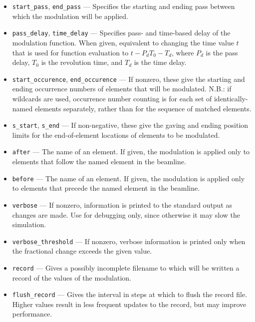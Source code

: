 \documentclass[11pt]{article}
\begin{document}
\begin{itemize}
\begin{itemize}
    \item \verb|differential=0|, \verb|multiplicative=0|: $v(t) = f A(t)$.  
    \item \verb|differential=1|, \verb|multiplicative=1|: $v(t) = v_0 + v_0 f A(t)$.  
    \item \verb|differential=0|, \verb|multiplicative=1|: $v(t) = v_0 f A(t)$.  
    \end{itemize}
    where $v_0$ is the original value and $f$ is the factor. The factor is convenient when $A(t)$ is
    from a file and one wants to quickly change the amplitude of the modulation but not its shape.
\item \verb|start_pass|, \verb|end_pass| --- Specifies the starting and ending pass between which the
modulation will be applied. 
\item  \verb|pass_delay|, \verb|time_delay| --- Specifies pass- and time-based delay of the modulation
  function. When given, equivalent to changing the time value $t$ that is used for function evaluation
  to $t- P_d T_0 - T_d$, where $P_d$ is
  the pass delay, $T_0$ is the revolution time, and $T_d$ is the time delay.
\item \verb|start_occurence|, \verb|end_occurence| --- If nonzero, these give the starting and
 ending occurrence numbers of elements that will be modulated. N.B.: if wildcards are used, occurrence
 number counting is for each set of identically-named elements separately, rather than for the sequence
 of matched elements.
\item \verb|s_start|, \verb|s_end| --- If non-negative, these give the gaving and ending position
 limits for the end-of-element locations of elements to be modulated.
\item \verb|after| --- The name of an element.  If given, the modulation is applied only to elements
 that follow the named element in the beamline.  
\item \verb|before| --- The name of an element.  If given, the modulation is applied only to elements
 that precede the named element in the beamline. 
\item \verb|verbose| --- If nonzero, information is printed to the standard output as changes are
        made.  Use for debugging only, since otherwise it may slow the simulation.
\item \verb|verbose_threshold| --- If nonzero, verbose information is printed only when the fractional change
   exceeds the given value.
\item \verb|record| --- Gives a possibly incomplete filename to which will be written a record of the values of
  the modulation.
\item \verb|flush_record| --- Gives the interval in steps at which to flush the record file. Higher values result
 in less frequent  updates to the record, but may improve performance.
\end{itemize}
\end{document}
